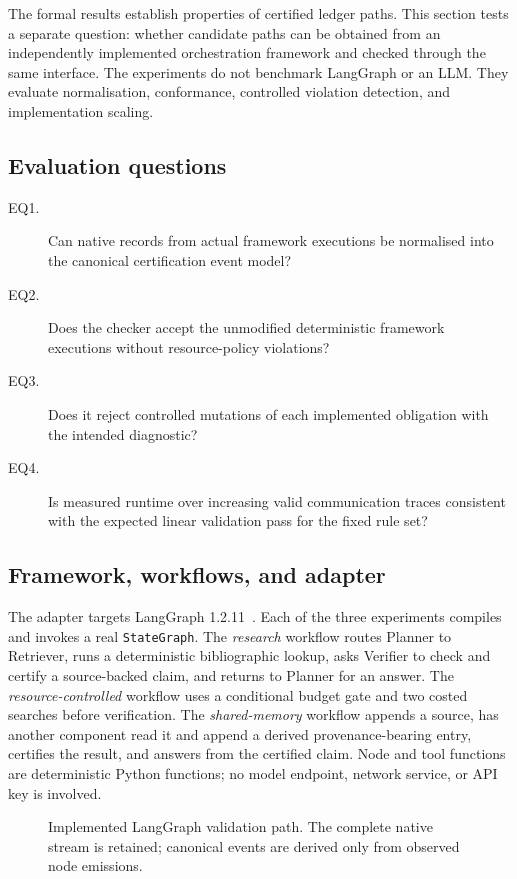\documentclass[a4paper,fleqn]{cas-sc}
\begin{document}
The formal results establish properties of certified ledger paths. This section
tests a separate question: whether candidate paths can be obtained from an
independently implemented orchestration framework and checked through the same
interface. The experiments do not benchmark LangGraph or an LLM. They evaluate
normalisation, conformance, controlled violation detection, and implementation
scaling.

\subsection{Evaluation questions}

\begin{description}
  \item[EQ1.] Can native records from actual framework executions be normalised
  into the canonical certification event model?
  \item[EQ2.] Does the checker accept the unmodified deterministic framework
  executions without resource-policy violations?
  \item[EQ3.] Does it reject controlled mutations of each implemented
  obligation with the intended diagnostic?
  \item[EQ4.] Is measured runtime over increasing valid communication traces
  consistent with the expected linear validation pass for the fixed rule set?
\end{description}

\subsection{Framework, workflows, and adapter}

The adapter targets LangGraph 1.2.11~\cite{langgraph2026handoffs}. Each of the
three experiments compiles and invokes a real \texttt{StateGraph}. The
\emph{research} workflow routes Planner to Retriever, runs a deterministic
bibliographic lookup, asks Verifier to check and certify a source-backed claim,
and returns to Planner for an answer. The \emph{resource-controlled} workflow
uses a conditional budget gate and two costed searches before verification.
The \emph{shared-memory} workflow appends a source, has another component read
it and append a derived provenance-bearing entry, certifies the result, and
answers from the certified claim. Node and tool functions are deterministic
Python functions; no model endpoint, network service, or API key is involved.

\begin{figure}[tbp]
\centering

\caption{Implemented LangGraph validation path. The complete native stream is
retained; canonical events are derived only from observed node emissions.}
\label{fig:langgraph-pipeline}
\end{figure}
\end{document}
